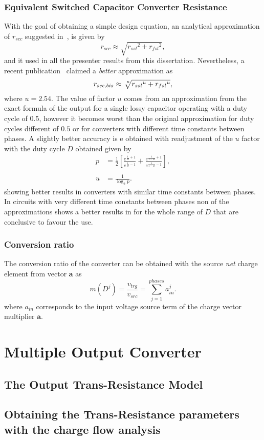 \subsubsection{Equivalent Switched Capacitor Converter Resistance}
With the goal of obtaining a simple design equation, an analytical approximation of $r_{scc}$ suggested in~\cite{1998Arntzen,1999Maksimovic}, is given by
\begin{equation}
r_{scc} \approx \sqrt{{r_{ssl}}^2+{r_{fsl}}^2},
\label{eq:r_scc}
\end{equation}
and it used in all the presenter results from this dissertation. Nevertheless, a recent publication~\cite{2012Makowski} claimed a \emph{better} approximation as
\begin{equation}
r_{scc,bis} \approx \sqrt[\leftroot{-3}\uproot{3} u]{{r_{ssl}}^{u}+{r_{fsl}}^{u}},
\label{eq:r_scc_II}
\end{equation}
where $u = 2.54$. The value of factor $u$ comes from an approximation from the exact formula of the output for a single lossy capacitor operating with a duty cycle of $0.5$, however it becomes worst than the original approximation for duty cycles different of $0.5$ or for converters with different time constants between phases. A slightly better accuracy is e obtained with readjustment of the $u$ factor with the duty cycle $D$ obtained given by
\begin{align}
p & = \frac{1}{2} \left[ \frac{e^{\frac{1}{D}+1}}{e^{\frac{1}{D}-1}} + \frac{e^{\frac{1}{1-D}+1}}{e^{\frac{1}{1-D}-1}} \right], 
\\
\\
u &= \frac{1}{\log_2 p}.
\label{eq:u_factor}
\end{align}
showing better results in converters with similar time constants between phases. In circuits with very different time constants between phases non of the approximations shows a better results in for the whole range of $D$ that are conclusive to favour the use.

\subsubsection{Conversion ratio}

The conversion ratio of the converter can be obtained with the source \emph{net} charge element from vector $\mathbf{a}$ as
\begin{equation}
m(D^j)=\frac{{v_{trg}}}{v_{src}}=\sum_{j=1}^{phases}a_{in}^j.
\label{eq:r_ssl}
\end{equation}
where $a_{in}$  corresponds to the input voltage source term of the charge
vector multiplier $\mathbf{a}$.

\section{Multiple Output Converter}


\subsection{The Output Trans-Resistance Model}
\subsection{Obtaining the Trans-Resistance parameters with the charge flow analysis }




\clearpage

 